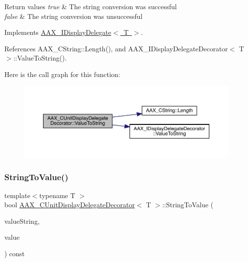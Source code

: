 \begin{DoxyRetVals}{Return values}
{\em true} & The string conversion was successful \\
\hline
{\em false} & The string conversion was unsuccessful \\
\hline
\end{DoxyRetVals}


Implements \mbox{\hyperlink{a01801_a471c7381db773683b69216a9c3f5eda7}{A\+A\+X\+\_\+\+I\+Display\+Delegate$<$ T $>$}}.



References A\+A\+X\+\_\+\+C\+String\+::\+Length(), and A\+A\+X\+\_\+\+I\+Display\+Delegate\+Decorator$<$ T $>$\+::\+Value\+To\+String().

Here is the call graph for this function\+:
\nopagebreak
\begin{figure}[H]
\begin{center}
\leavevmode
\includegraphics[width=350pt]{a01585_a2a5d19b4d616c56e2c5e671cd3741ad3_cgraph}
\end{center}
\end{figure}
\mbox{\label{a01585_a4577b27d63067a75deead21c25f1b932}} 
\subsubsection{\texorpdfstring{StringToValue()}{StringToValue()}}
{\footnotesize\ttfamily template$<$typename T $>$ \\
bool \mbox{\hyperlink{a01585}{A\+A\+X\+\_\+\+C\+Unit\+Display\+Delegate\+Decorator}}$<$ T $>$\+::String\+To\+Value (\begin{DoxyParamCaption}\item[{const \mbox{\hyperlink{a01573}{A\+A\+X\+\_\+\+C\+String}} \&}]{value\+String,  }\item[{T $\ast$}]{value }\end{DoxyParamCaption}) const\hspace{0.3cm}{\ttfamily [virtual]}}



